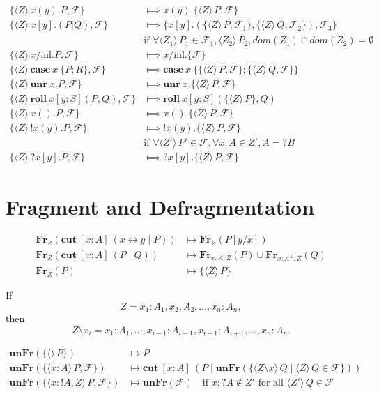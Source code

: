 \documentclass{article}
\newcommand{\cut}[4]{\mathbf{cut}\: [#1:#2] \: (#3 \mid #4)}
\newcommand{\unroll}[2]{\mathbf{unr}\:#1.#2}
\newcommand{\roll}[5]{\mathbf{roll}\:#1 [#2:#3] (#4,#5)}
\newcommand{\case}[2]{\mathbf{case}\:#1\:\{#2\}}
\newcommand{\sel}[3]{#1/\mathrm{#2}.#3}
\newcommand{\fragment}[2]{\langle #1 \rangle \, #2}
\def\link{\leftrightarrow}
\def\goesto{\Longmapsto}
\def\F{\mathcal{F}}
\def\Fr{\mathbf{Fr}}
\def\unFr{\mathbf{unFr}}
\begin{document}
\begin{align*}
  \{ \fragment{Z}{x(y).P}, \F \} &\goesto x(y).\{\fragment{Z}{P}, \F\} \\
  \{ \fragment{Z}{x[y].(P|Q)}, \F \} &\goesto \{ x[y].(\{\fragment{Z}{P}, \F_1\},\{\fragment{Z}{Q}, \F_2\}),\F_3 \} \\
  & \text{if $\forall \fragment{Z_1}{P_1} \in \F_1,\fragment{Z_2}{P_2},dom(Z_1) \cap dom(Z_2) = \emptyset$} \\
  \{ \fragment{Z}{\sel{x}{inl}{P}}, \F \} &\goesto \sel{x}{inl}{\{\F\}} \\
  \{ \fragment{Z}{\case{x}{P;R}}, \F \} &\goesto \case{x}{\{\fragment{Z}{P},\F\};\{\fragment{Z}{Q},\F\}} \\
  \{ \fragment{Z}{\unroll{x}{P}}, \F \} &\goesto \unroll{x}{\{\fragment{Z}{P}, \F\}} \\
  \{ \fragment{Z}{\roll{x}{y}{S}{P}{Q}}, \F \} &\goesto \roll{x}{y}{S}{\{\fragment{Z}{P}\}}{Q} \\
  \{ \fragment{Z}{x().P}, \F \} &\goesto x().\{\fragment{Z}{P},\F\} \\
  \{ \fragment{Z}{!x(y).P}, \F\} &\goesto !x(y).\{\fragment{Z}{P}, \F\} \\
  &\text{if $\forall \fragment{Z'}{P'} \in \F,\forall x:A \in Z', A = {?B}$} \\
  \{ \fragment{Z}{?x[y].P}, \F\} &\goesto ?x[y].\{\fragment{Z}{P}, \F\}
\end{align*}

\section{Fragment and Defragmentation}

\begin{align*}
  \Fr_Z(\cut{x}{A}{x \link y}{P}) &\mapsto \Fr_Z(P[y/x]) \\
  \Fr_Z(\cut{x}{A}{P}{Q}) &\mapsto \Fr_{x:A,Z}(P) \cup \Fr_{x:A^\perp,Z}(Q) \\
  \Fr_Z(P) &\mapsto \{ \fragment{Z}{P} \}
\end{align*}

\noindent
If \[Z = x_1:A_1, x_2,A_2, \dots, x_n:A_n,\] then \[Z \setminus x_i = x_1:A_1,\dots,x_{i-1}:A_{i-1},x_{i+1}:A_{i+1},\dots,x_n:A_n.\]

\begin{align*}
  \unFr(\{\fragment{}{P}\}) &\mapsto P \\
  \unFr(\{\fragment{x:A}{P},\F\}) &\mapsto \cut{x}{A}{P}{\unFr(\{\fragment{Z \setminus x}{Q} \mid \fragment{Z}{Q} \in \F\})} \\
  \unFr(\{\fragment{x:{!A},Z}{P},\F\}) &\mapsto \unFr(\F) \quad \text{if $x:{?A} \notin Z'$ for all $\fragment{Z'}{Q} \in \F$}
\end{align*}
\end{document}
